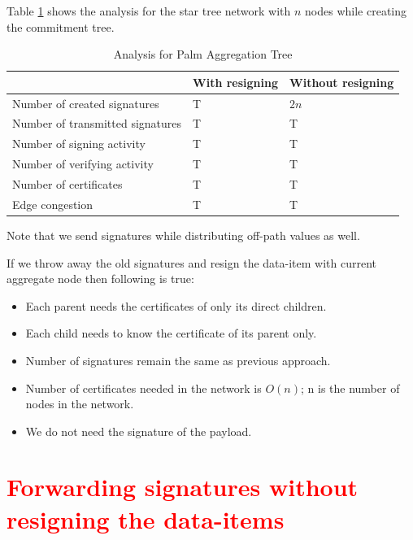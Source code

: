 	  Table \ref{table:Analysis table for Palm Aggregation Tree} shows the analysis for the star tree network with $n$ nodes while creating the commitment tree.
		\begin{table}[!htb]	
			\begin{center}
				\begin{tabular}{ |l| l| l| }
			    \hline
			    & With resigning & Without resigning \\
			    \hline
			    Number of created signatures & T & $2n$ \\	
			    \hline
			    Number of transmitted signatures & T & T\\
			    \hline
			    Number of signing activity & T & T \\
			    \hline
			    Number of verifying activity & T & T \\
			    \hline
			    Number of certificates & T & T \\
			    \hline
			    Edge congestion & T & T\\
			    \hline
				\end{tabular}
			\end{center}
	  	\caption{Analysis for Palm Aggregation Tree}
		  \label{table:Analysis table for Palm Aggregation Tree}
	  \end{table} 
		
		Note that we send signatures while distributing off-path values as well.
	
		If we throw away the old signatures and resign the data-item with current aggregate node then following is true:
			\begin{itemize}
				\item Each parent needs the certificates of only its direct children.
				\item Each child needs to know the certificate of its parent only.
				\item Number of signatures remain the same as previous approach.
				\item Number of certificates needed in the network is $O(n)$; n is the number of nodes in the network.
				\item We do not need the signature of the payload.
			\end{itemize}

	\section{\textcolor{red}{Forwarding signatures without resigning the data-items}}
